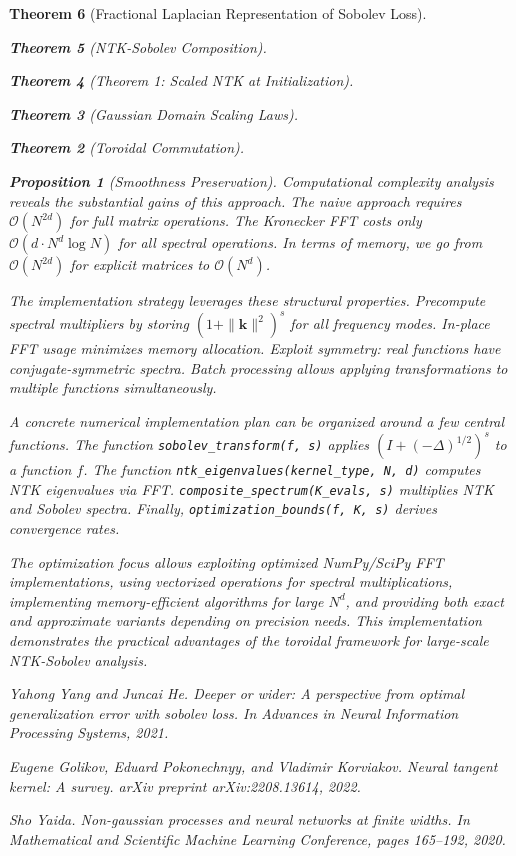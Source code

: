 \documentclass{article}
\newtheorem{theorem}{Theorem}[section]
\newtheorem{proposition}[theorem]{Proposition}
\begin{document}
\begin{theorem}[Fractional Laplacian Representation of Sobolev Loss]
\begin{theorem}[NTK-Sobolev Composition]
\begin{theorem}[Theorem 1: Scaled NTK at Initialization]
\begin{theorem}[Gaussian Domain Scaling Laws]
\begin{theorem}[Toroidal Commutation]
\begin{proposition}[Smoothness Preservation]
Computational complexity analysis reveals the substantial gains of this approach. The naive approach requires $\mathcal{O}(N^{2d})$ for full matrix operations. The Kronecker FFT costs only $\mathcal{O}(d \cdot N^d \log N)$ for all spectral operations. In terms of memory, we go from $\mathcal{O}(N^{2d})$ for explicit matrices to $\mathcal{O}(N^d)$.

The implementation strategy leverages these structural properties. Precompute spectral multipliers by storing $(1 + \|\mathbf{k}\|^2)^s$ for all frequency modes. In-place FFT usage minimizes memory allocation. Exploit symmetry: real functions have conjugate-symmetric spectra. Batch processing allows applying transformations to multiple functions simultaneously.

A concrete numerical implementation plan can be organized around a few central functions. The function \texttt{sobolev\_transform(f, s)} applies $(I + (-\Delta)^{1/2})^s$ to a function $f$. The function \texttt{ntk\_eigenvalues(kernel\_type, N, d)} computes NTK eigenvalues via FFT. \texttt{composite\_spectrum(K\_evals, s)} multiplies NTK and Sobolev spectra. Finally, \texttt{optimization\_bounds(f, K, s)} derives convergence rates.

The optimization focus allows exploiting optimized NumPy/SciPy FFT implementations, using vectorized operations for spectral multiplications, implementing memory-efficient algorithms for large $N^d$, and providing both exact and approximate variants depending on precision needs. This implementation demonstrates the practical advantages of the toroidal framework for large-scale NTK-Sobolev analysis.


\newpage



\begin{thebibliography}{10}

Yahong Yang and Juncai He.
\newblock Deeper or wider: A perspective from optimal generalization error with sobolev loss.
\newblock In \emph{Advances in Neural Information Processing Systems}, 2021.

Eugene Golikov, Eduard Pokonechnyy, and Vladimir Korviakov.
\newblock Neural tangent kernel: A survey.
\newblock \emph{arXiv preprint arXiv:2208.13614}, 2022.

Sho Yaida.
\newblock Non-gaussian processes and neural networks at finite widths.
\newblock In \emph{Mathematical and Scientific Machine Learning Conference}, pages 165--192, 2020.


\end{thebibliography}
\end{proposition}
\end{theorem}
\end{theorem}
\end{theorem}
\end{theorem}
\end{theorem}
\end{document}
